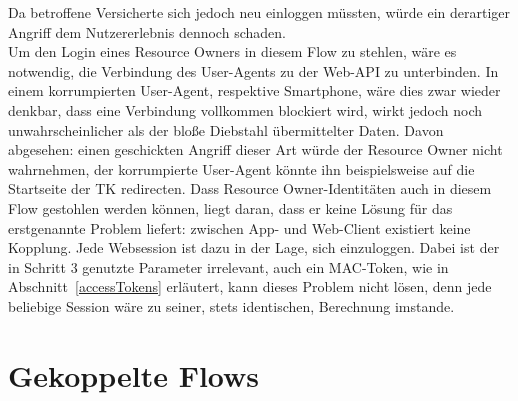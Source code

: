 Da betroffene Versicherte sich jedoch neu einloggen müssten, würde ein
derartiger Angriff dem Nutzererlebnis dennoch schaden.
\\
Um den Login eines Resource Owners in diesem Flow zu stehlen, wäre es notwendig,
die Verbindung des User-Agents zu der Web-API zu unterbinden. In einem
korrumpierten User-Agent, respektive Smartphone, wäre dies zwar wieder denkbar,
dass eine Verbindung vollkommen blockiert wird, wirkt jedoch noch
unwahrscheinlicher als der bloße Diebstahl übermittelter Daten. Davon abgesehen:
einen geschickten Angriff dieser Art würde der Resource Owner nicht wahrnehmen,
der korrumpierte User-Agent könnte ihn beispielsweise auf die Startseite der TK
redirecten. Dass Resource Owner-Identitäten auch in diesem Flow gestohlen werden
können, liegt daran, dass er keine Lösung für das erstgenannte Problem liefert:
zwischen App- und Web-Client existiert keine Kopplung. Jede Websession ist dazu
in der Lage, sich einzuloggen. Dabei ist der in Schritt 3 genutzte Parameter
irrelevant, auch ein MAC-Token, wie in Abschnitt~\ref{accessTokens} erläutert,
kann dieses Problem nicht lösen, denn jede beliebige Session wäre zu seiner,
stets identischen, Berechnung imstande.
\\

\section{Gekoppelte Flows}\label{ch:GekoppelteFlows}

